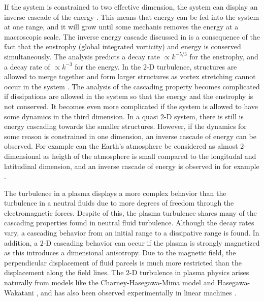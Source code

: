If the system is constrained to two effective dimension, the system can display an inverse cascade of the energy \cite{Kraichan1980}.
This means that energy can be fed into the system at one range, and it will grow until some mechanis removes the energy at a macroscopic scale.
The inverse energy cascade discussed in \cite{Kraichan1980} is a consequence of the fact that the enstrophy (global integrated vorticity) and energy is conserved simultaneously.
The analysis predicts a decay rate $\propto k^{-5/3}$ for the enstrophy, and a decay rate of $\propto k^{-3}$ for the energy.
In the $2$-D turbulence, structures are allowed to merge together and form larger structures as vortex stretching cannot occur in the system \cite{Fjortoft1953}.
The analysis of the cascading property becomes complicated if dissipations are allowed in the system so that the energy and the enstrophy is not conserved.
It becomes even more complicated if the system is allowed to have some dynamics in the third dimension.
In a quasi $2$-D system, there is still is energy cascading towards the smaller structures.
However, if the dynamics for some reason is constrained in one dimension, an inverse cascade of energy can be observed.
For example can the Earth's atmosphere be considered as almost $2$-dimensional as heigth of the atmosphere is small compared to the longitudal and latitudinal dimension, and an inverse cascade of energy is observed in for example \cite{Smith2002}.

The turbulence in a plasma displays a more complex behavior than the turbulence in a neutral fluids due to more degrees of freedom through the electromagnetic forces.
Despite of this, the plasma turbulence shares many of the cascading properties found in neutral fluid turbulence.
Although the decay rates vary, a cascading behavior from an initial range to a dissipative range is found.
In addition, a $2$-D cascading behavior can occur if the plasma is strongly magnetized as this introduces a dimensional anisotropy.
Due to the magnetic field, the perpendicular displacement of fluid parcels is much more restricted than the displacement along the field lines.
The $2$-D turbulence in plasma physics arises naturally from models like the Charney-Hasegawa-Mima model \cite{Boffetta2002} and Hasegawa-Wakatani \cite{Manz2009}, and has also been observed experimentally in linear machines \cite{Tynan2006a}.

